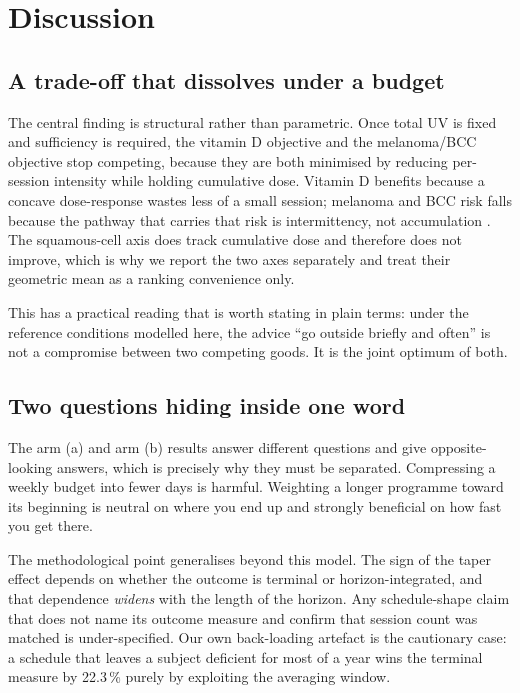\documentclass[11pt]{article}
\begin{document}
\section{Discussion}

\subsection{A trade-off that dissolves under a budget}

The central finding is structural rather than parametric. Once total
UV is fixed and sufficiency is required, the vitamin D objective and
the melanoma/BCC objective stop competing, because they are both
minimised by reducing per-session intensity while holding cumulative
dose. Vitamin D benefits because a concave dose-response wastes less
of a small session; melanoma and BCC risk falls because the pathway
that carries that risk is intermittency, not accumulation
\citep{elwood1997,leiter2009}. The squamous-cell axis does track
cumulative dose and therefore does not improve, which is why we report
the two axes separately and treat their geometric mean as a ranking
convenience only.

This has a practical reading that is worth stating in plain terms:
under the reference conditions modelled here, the advice ``go outside
briefly and often'' is not a compromise between two competing goods.
It is the joint optimum of both.

\subsection{Two questions hiding inside one word}

The arm (a) and arm (b) results answer different questions and give
opposite-looking answers, which is precisely why they must be
separated. Compressing a weekly budget into fewer days is harmful.
Weighting a longer programme toward its beginning is neutral on where
you end up and strongly beneficial on how fast you get there.

The methodological point generalises beyond this model. The sign of
the taper effect depends on whether the outcome is terminal or
horizon-integrated, and that dependence \emph{widens} with the length
of the horizon. Any schedule-shape claim that does not name its
outcome measure and confirm that session count was matched is
under-specified. Our own back-loading artefact is the cautionary case:
a schedule that leaves a subject deficient for most of a year wins the
terminal measure by 22.3\,\% purely by exploiting the averaging
window.
\end{document}
